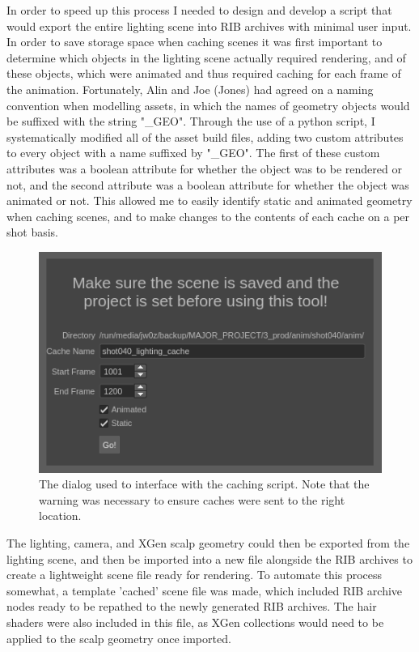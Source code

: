 \documentclass[11pt]{article}
\begin{document}
In order to speed up this process I needed to design and develop a script that would export the entire lighting scene into RIB archives with minimal user input. In order to save storage space when caching scenes it was first important to determine which objects in the lighting scene actually required rendering, and of these objects, which were animated and thus required caching for each frame of the animation. Fortunately, Alin and Joe (Jones) had agreed on a naming convention when modelling assets, in which the names of geometry objects would be suffixed with the string "\_GEO". Through the use of a python script, I systematically modified all of the asset build files, adding two custom attributes to every object with a name suffixed by "\_GEO". The first of these custom attributes was a boolean attribute for whether the object was to be rendered or not, and the second attribute was a boolean attribute for whether the object was animated or not. This allowed me to easily identify static and animated geometry when caching scenes, and to make changes to the contents of each cache on a per shot basis.

\begin{figure}[htbp]\centering
	\includegraphics[width=1.0\linewidth]{images/cache_tool.png}
	\caption{\label{figure:cache_tool} The dialog used to interface with the caching script. Note that the warning was necessary to ensure caches were sent to the right location.}
\end{figure}

\newpage

The lighting, camera, and XGen scalp geometry could then be exported from the lighting scene, and then be imported into a new file alongside the RIB archives to create a lightweight scene file ready for rendering. To automate this process somewhat, a template 'cached' scene file was made, which included RIB archive nodes ready to be repathed to the newly generated RIB archives. The hair shaders were also included in this file, as XGen collections would need to be applied to the scalp geometry once imported.
\end{document}
